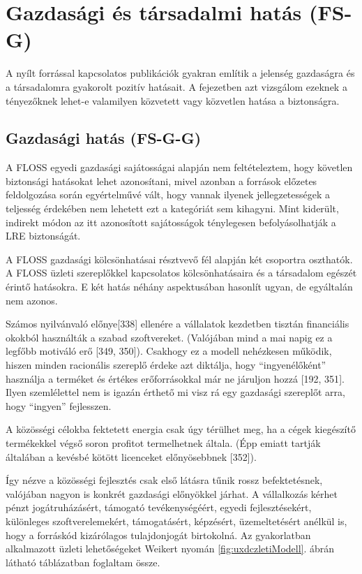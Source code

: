 \documentclass[12pt,magyar,a4paper,oneside]{scrreprt}
\begin{document}
\hypertarget{gazdasuxe1gi-uxe9s-tuxe1rsadalmi-hatuxe1s-fs-g}{%
\section{Gazdasági és társadalmi hatás
(FS-G)}\label{gazdasuxe1gi-uxe9s-tuxe1rsadalmi-hatuxe1s-fs-g}}

A nyílt forrással kapcsolatos publikációk gyakran említik a jelenség
gazdaságra és a társadalomra gyakorolt pozitív hatásait. A fejezetben
azt vizsgálom ezeknek a tényezőknek lehet-e valamilyen közvetett vagy
közvetlen hatása a biztonságra.

\hypertarget{sec:FS-G-G}{%
\subsection{Gazdasági hatás (FS-G-G)}\label{sec:FS-G-G}}

A FLOSS egyedi gazdasági sajátosságai alapján nem feltételeztem, hogy
követlen biztonsági hatásokat lehet azonosítani, mivel azonban a
források előzetes feldolgozása során egyértelművé vált, hogy vannak
ilyenek jellegzetességek a teljesség érdekében nem lehetett ezt a
kategóriát sem kihagyni. Mint kiderült, indirekt módon az itt
azonosított sajátosságok ténylegesen befolyásolhatják a LRE biztonságát.

A FLOSS gazdasági kölcsönhatásai résztvevő fél alapján két csoportra
oszthatók. A FLOSS üzleti szereplőkkel kapcsolatos kölcsönhatásaira és a
társadalom egészét érintő hatásokra. E két hatás néhány aspektusában
hasonlít ugyan, de egyáltalán nem azonos.

Számos nyilvánvaló előnye{[}338{]} ellenére a vállalatok kezdetben
tisztán financiális okokból használták a szabad szoftvereket. (Valójában
mind a mai napig ez a legfőbb motiváló erő {[}349, 350{]}). Csakhogy ez
a modell nehézkesen működik, hiszen minden racionális szereplő érdeke
azt diktálja, hogy ``ingyenélőként'' használja a terméket és értékes
erőforrásokkal már ne járuljon hozzá {[}192, 351{]}. Ilyen szemlélettel
nem is igazán érthető mi visz rá egy gazdasági szereplőt arra, hogy
``ingyen'' fejlesszen.

A közösségi célokba fektetett energia csak úgy térülhet meg, ha a cégek
kiegészítő termékekkel végső soron profitot termelhetnek általa. (Épp
emiatt tartják általában a kevésbé kötött licenceket előnyösebbnek
{[}352{]}).

Így nézve a közösségi fejlesztés csak első látásra tűnik rossz
befektetésnek, valójában nagyon is konkrét gazdasági előnyökkel járhat.
A vállalkozás kérhet pénzt jogátruházásért, támogató tevékenységéért,
egyedi fejlesztésekért, különleges szoftverelemekért, támogatásért,
képzésért, üzemeltetésért anélkül is, hogy a forráskód kizárólagos
tulajdonjogát birtokolná. Az gyakorlatban alkalmazott üzleti
lehetőségeket Weikert nyomán \ref{fig:uxdczletiModell}. ábrán látható
táblázatban foglaltam össze.
\end{document}
